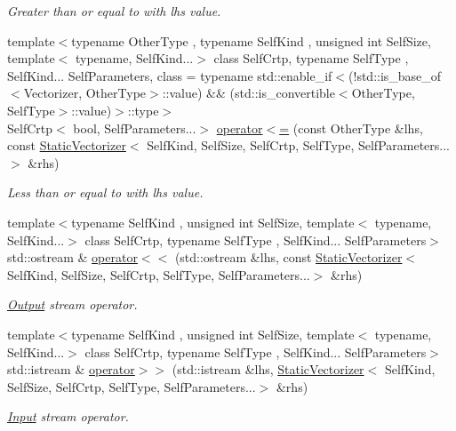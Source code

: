 \begin{DoxyCompactItemize}
\begin{DoxyCompactList}\small\item\em Greater than or equal to with lhs value. \end{DoxyCompactList}\item 
{\footnotesize template$<$typename Other\-Type , typename Self\-Kind , unsigned int Self\-Size, template$<$ typename, Self\-Kind...$>$ class Self\-Crtp, typename Self\-Type , Self\-Kind... Self\-Parameters, class  = typename std\-::enable\-\_\-if$<$(!std\-::is\-\_\-base\-\_\-of$<$\-Vectorizer, Other\-Type$>$\-::value) \&\& (std\-::is\-\_\-convertible$<$\-Other\-Type, Self\-Type$>$\-::value)$>$\-::type$>$ }\\Self\-Crtp$<$ bool, Self\-Parameters...$>$ \hyperlink{namespacemagrathea_a15482f99cfecbb2bb4fde496fb28b436}{operator$<$=} (const Other\-Type \&lhs, const \hyperlink{classmagrathea_1_1StaticVectorizer}{Static\-Vectorizer}$<$ Self\-Kind, Self\-Size, Self\-Crtp, Self\-Type, Self\-Parameters...$>$ \&rhs)
\begin{DoxyCompactList}\small\item\em Less than or equal to with lhs value. \end{DoxyCompactList}\item 
{\footnotesize template$<$typename Self\-Kind , unsigned int Self\-Size, template$<$ typename, Self\-Kind...$>$ class Self\-Crtp, typename Self\-Type , Self\-Kind... Self\-Parameters$>$ }\\std\-::ostream \& \hyperlink{namespacemagrathea_ac7963bfb5650026fb34b911f986aa8cc}{operator$<$$<$} (std\-::ostream \&lhs, const \hyperlink{classmagrathea_1_1StaticVectorizer}{Static\-Vectorizer}$<$ Self\-Kind, Self\-Size, Self\-Crtp, Self\-Type, Self\-Parameters...$>$ \&rhs)
\begin{DoxyCompactList}\small\item\em \hyperlink{exceptionOutput}{Output} stream operator. \end{DoxyCompactList}\item 
{\footnotesize template$<$typename Self\-Kind , unsigned int Self\-Size, template$<$ typename, Self\-Kind...$>$ class Self\-Crtp, typename Self\-Type , Self\-Kind... Self\-Parameters$>$ }\\std\-::istream \& \hyperlink{namespacemagrathea_aac3f911d40a31500423871397fb4f8d7}{operator$>$$>$} (std\-::istream \&lhs, \hyperlink{classmagrathea_1_1StaticVectorizer}{Static\-Vectorizer}$<$ Self\-Kind, Self\-Size, Self\-Crtp, Self\-Type, Self\-Parameters...$>$ \&rhs)
\begin{DoxyCompactList}\small\item\em \hyperlink{exceptionInput}{Input} stream operator. \end{DoxyCompactList}\item 

\end{DoxyCompactItemize}

